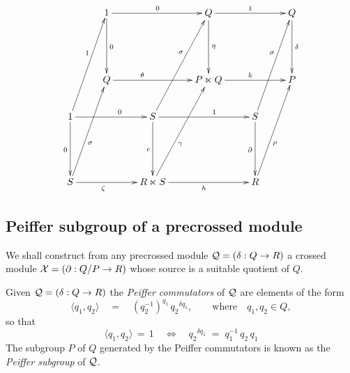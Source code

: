 \begin{equation} \label{eq:tp-quotient-morphism}
\vcenter{\xy
\xymatrix{
     & 1 \ar[dd]^{0} \ar[rr]^0
         &   & Q \ar[rr]^{1} \ar[dd]^{\eta} 
                 &   & Q \ar[dd]^{\delta}  \\
     &   &   &   &   & \\ 
     & Q \ar[rr]^(0.35){\theta} 
         &   & P \ltimes Q \ar[rr]^{k} 
                 &   & P  \\ 
  1 \ar[dd]_{0} \ar[rr]^(0.6){0} \ar[ruuu]^(0.6){1} 
     &   & S \ar[rr]^(0.6){1} \ar[dd]_{\epsilon} \ar[ruuu]^(0.6){\sigma}  
             &   & S \ar[dd]_{\partial} \ar[ruuu]^(0.6){\sigma} 
                     & \\
     &   &   &   &   & \\
  S \ar[rr]_(0.4){\zeta} \ar[ruuu]_(0.4){\sigma} 
     &   & R \ltimes S \ar[rr]_{h} \ar[ruuu]_(0.4){\gamma} 
             &   & R \ar[ruuu]_(0.4){\rho} 
                     & \\
}
\endxy} 
\end{equation}


\bigskip
\subsection{Peiffer subgroup of a precrossed module} \label{subs:Peiffer}

We shall construct from any precrossed module $\mathcal{Q} = (\delta : Q \to R)$ 
a crossed module $\mathcal{X} = (\partial : Q/P \to R)$ whose source is a suitable 
quotient of $Q$. 

Given  $\mathcal{Q} = (\delta : Q \to R)$
the \emph{Peiffer commutators}  of  $\mathcal{Q}$  are elements of the form
 
$$
\langle q_1,q_2 \rangle 
\quad=\quad 
(q_2^{-1})^{q_1}\,{q_2}^{\delta q_1},
\qquad \mbox{where} \quad q_1,q_2 \in Q,
$$
so that
$$
\langle q_1,q_2 \rangle \,=\, 1 \quad \Leftrightarrow \quad
{q_2}^{\delta q_1} \;=\; q_1^{-1}\,q_2\,q_1
$$
The subgroup  $P$  of  $Q$  generated by the Peiffer commutators 
is known as the \emph{Peiffer subgroup} of  $\mathcal{Q}$.

